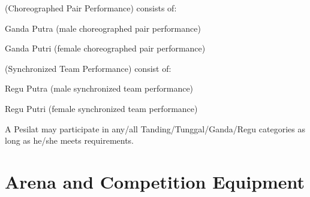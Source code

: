 \begin{legal}
\begin{legal}
    \item {} (Choreographed Pair Performance) consists of:
        \begin{legal}
        \item Ganda Putra (male choreographed pair performance)
        \item Ganda Putri (female choreographed pair performance)
        \end{legal}

    \item {} (Synchronized Team Performance) consist of:
        \begin{legal}
        \item Regu Putra (male synchronized team performance)
        \item Regu Putri (female synchronized team performance)
        \end{legal}
    \end{legal}


    A Pesilat may participate in any/all Tanding/Tunggal/Ganda/Regu categories as long as he/she 
    meets requirements.
\end{legal}


\section{Arena and Competition Equipment}


